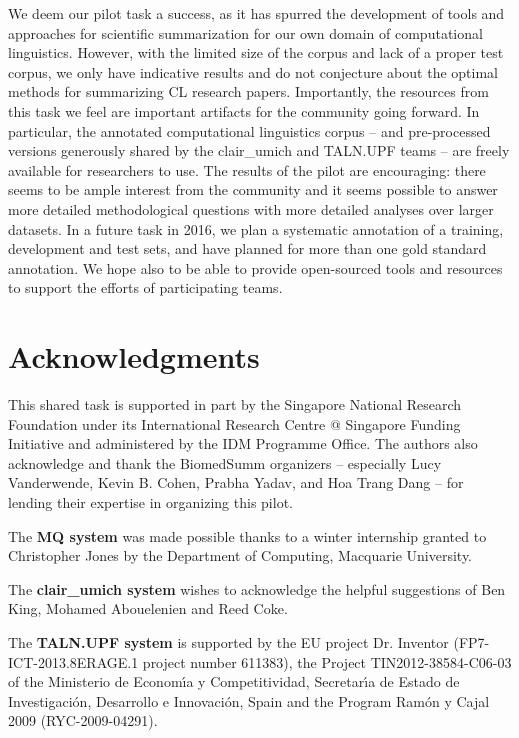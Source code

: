 \documentclass[11pt]{article}
\begin{document}
We deem our pilot task a success, as it has spurred the development of
tools and approaches for scientific summarization for our own domain
of computational linguistics.
However, with the limited size of the corpus and lack of a proper test
corpus, we only have indicative results and do not conjecture about
the optimal methods for summarizing CL research papers.  Importantly,
the resources from this task we feel are important artifacts for the
community going forward.  In particular, the annotated computational
linguistics corpus -- and pre-processed versions generously shared by
the clair\_umich and TALN.UPF teams -- are freely available for
researchers to use.
The results of the pilot are encouraging: there seems to be ample
interest from the community and it seems possible to answer more
detailed methodological questions with more detailed analyses over
larger datasets.  In a future task in 2016, we plan a systematic
annotation of a training, development and test sets, and have planned
for more than one gold standard annotation.  We hope also to be able
to provide open-sourced tools and resources to support the efforts of
participating teams.



\section{Acknowledgments}
This shared task is supported in part by the Singapore National
Research Foundation under its International Research Centre @
Singapore Funding Initiative and administered by the IDM Programme
Office.  The authors also acknowledge and thank the BiomedSumm
organizers -- especially Lucy Vanderwende, Kevin B. Cohen, Prabha
Yadav, and Hoa Trang Dang -- for lending their expertise in organizing
this pilot.

The {\bf MQ system} was made possible thanks to a winter internship
granted to Christopher Jones by the Department of Computing, Macquarie
University.

The {\bf clair\_umich system} wishes to acknowledge the helpful
suggestions of Ben King, Mohamed Abouelenien and Reed Coke.

The {\bf TALN.UPF system} is supported by the EU project Dr. Inventor
(FP7-ICT-2013.8ERAGE.1 project number 611383), the Project
TIN2012-38584-C06-03 of the Ministerio de Econom\'{\i}a y
Competitividad, Secretar\'{\i}a de Estado de Investigaci\'on,
Desarrollo e Innovaci\'on, Spain and the Program Ram\'on y Cajal 2009
(RYC-2009-04291).


\end{document}
